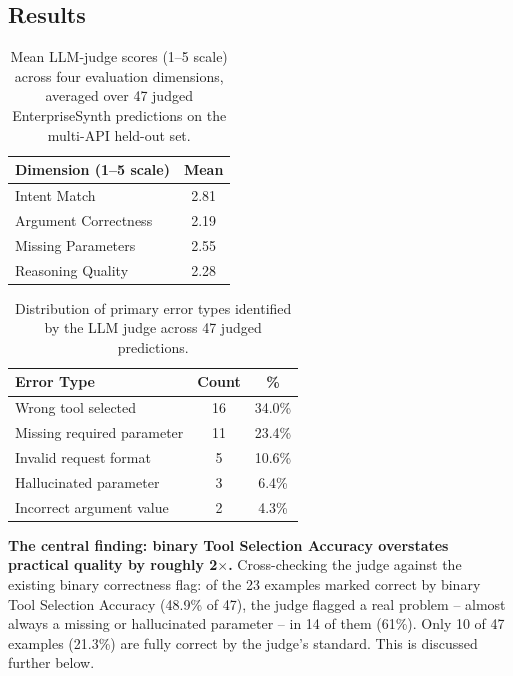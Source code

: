\documentclass[letterpaper]{article} %
\begin{document}
\subsection{Results}

\begin{table}[htbp]
\centering
\footnotesize
\setlength{\tabcolsep}{2pt}
\caption{Mean LLM-judge scores (1--5 scale) across four evaluation dimensions, averaged over 47
judged EnterpriseSynth predictions on the multi-API held-out set.}
\label{tab:judge-dimensions}
\begin{tabular}{lc}
\toprule
\textbf{Dimension (1--5 scale)} & \textbf{Mean} \\
\midrule
Intent Match & 2.81 \\
Argument Correctness & 2.19 \\
Missing Parameters & 2.55 \\
Reasoning Quality & 2.28 \\
\bottomrule
\end{tabular}
\end{table}

\begin{table}[htbp]
\centering
\footnotesize
\setlength{\tabcolsep}{2pt}
\caption{Distribution of primary error types identified by the LLM judge across 47 judged
predictions.}
\label{tab:judge-error-types}
\begin{tabular}{lcc}
\toprule
\textbf{Error Type} & \textbf{Count} & \textbf{\%} \\
\midrule
Wrong tool selected & 16 & 34.0\% \\
Missing required parameter & 11 & 23.4\% \\
Invalid request format & 5 & 10.6\% \\
Hallucinated parameter & 3 & 6.4\% \\
Incorrect argument value & 2 & 4.3\% \\
\bottomrule
\end{tabular}
\end{table}

\textbf{The central finding: binary Tool Selection Accuracy overstates practical quality by
roughly 2$\times$.} Cross-checking the judge against the existing binary correctness flag: of the
23 examples marked correct by binary Tool Selection Accuracy (48.9\% of 47), the judge flagged a
real problem -- almost always a missing or hallucinated parameter -- in 14 of them (61\%). Only
10 of 47 examples (21.3\%) are fully correct by the judge's standard. This is discussed further
below.
\end{document}
